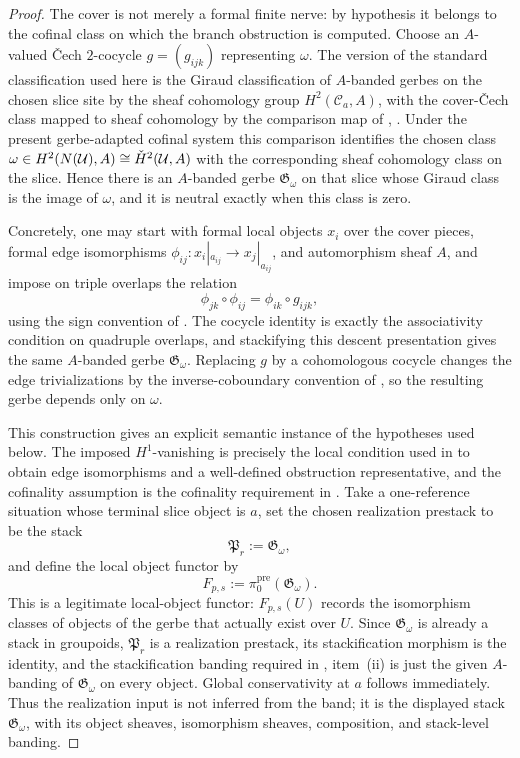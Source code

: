 \begin{proof}
The cover is not merely a formal finite nerve: by hypothesis it belongs to the
cofinal class on which the branch obstruction is computed. Choose an
$A$-valued \v{C}ech $2$-cocycle $g=(g_{ijk})$ representing $\omega$. The
version of the standard classification used here is the Giraud classification
of $A$-banded gerbes on the chosen slice site by the sheaf cohomology group
$H^2(\mathcal C_a,A)$, with the cover-\v{C}ech class mapped to sheaf cohomology
by the comparison map of 
\cite[Chap.~IV]{Giraud1971}, \cite[Tags 06NY and 06O9]{StacksProject}. Under
the present gerbe-adapted cofinal system this comparison identifies the chosen
class $\omega\in H^2(N(\mathcal U),A)\cong \check{H}^2(\mathcal U,A)$ with the
corresponding sheaf cohomology class on the slice. Hence there is an
$A$-banded gerbe $\mathfrak G_\omega$ on that slice whose Giraud class is the
image of $\omega$, and it is neutral exactly when this class is zero.

Concretely, one may start with formal local objects $x_i$ over the cover
pieces, formal edge isomorphisms $\phi_{ij}:x_i|_{a_{ij}}\to x_j|_{a_{ij}}$,
and automorphism sheaf $A$, and impose on triple overlaps the relation
\[
\phi_{jk}\circ\phi_{ij}
=
\phi_{ik}\circ g_{ijk},
\]
using the sign convention of . The cocycle
identity is exactly the associativity condition on quadruple overlaps, and
stackifying this descent presentation gives the same $A$-banded gerbe
$\mathfrak G_\omega$. Replacing $g$ by a cohomologous cocycle changes the edge
trivializations by the inverse-coboundary convention of
, so the resulting gerbe depends only on
$\omega$.

This construction gives an explicit semantic instance of the hypotheses used
below. The imposed $H^1$-vanishing is precisely the local condition used in
 to obtain edge isomorphisms and a
well-defined obstruction representative, and the cofinality assumption is the
cofinality requirement in . Take a
one-reference situation whose terminal slice object is $a$, set the chosen
realization prestack to be the stack
\[
\mathfrak P_r:=\mathfrak G_\omega,
\]
and define the local object functor by
\[
F_{p,s}:=\pi_0^{\mathrm{pre}}(\mathfrak G_\omega).
\]
This is a legitimate local-object functor: $F_{p,s}(U)$ records the isomorphism classes of objects of the gerbe that actually exist over $U$. Since $\mathfrak G_\omega$ is already a stack in groupoids, $\mathfrak P_r$ is a realization prestack, its stackification morphism is the identity, and the stackification banding required in , item~\textup{(ii)} is just the given $A$-banding of $\mathfrak G_\omega$ on every object. Global conservativity at $a$ follows immediately. Thus the realization input is not inferred from the band; it is the displayed stack $\mathfrak G_\omega$, with its object sheaves, isomorphism sheaves, composition, and stack-level banding.


\end{proof}

